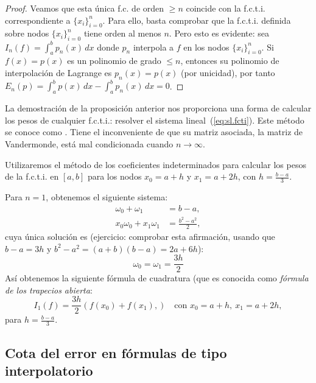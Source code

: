 \begin{proof}
   Veamos que esta única f.c. de orden $\ge n$ coincide con
  la f.c.t.i. correspondiente a $\{x_i\}_{i=0}^n$. Para ello, basta
  comprobar que la f.c.t.i. definida sobre nodos $\{x_i\}_{i=0}^n$
  tiene orden al menos $n$.
  Pero esto es evidente: sea $I_n(f)=\int_a^b p_n(x)\, dx$ donde $p_n$
  interpola a $f$ en los nodos $\{x_i\}_{i=0}^n$. Si $f(x)=p(x)$ es un
  polinomio de grado $\le n$, entonces su polinomio de interpolación
  de Lagrange es $p_n(x)=p(x)$ (por unicidad), por tanto
  $E_n(p)=\int_a^b p(x)\,dx - \int_a^b p_n(x)\,dx =0$.
\end{proof}

\begin{remark}
  \label{rk:6}
  La demostración de la proposición anterior nos proporciona una forma
  de calcular los pesos de cualquier f.c.t.i.: resolver el sistema
lineal~(\ref{eq:sl.fcti}). Este método se conoce como . Tiene el inconveniente de que su
matriz asociada, la matriz de Vandermonde, está mal condicionada
  cuando $n\to\infty$.
\end{remark}

\begin{example}
  \label{ex:coef-indetermin:formula-trapecios-abierta}
  Utilizaremos el método de los coeficientes indeterminados para
  calcular los pesos de la f.c.t.i. en $[a,b]$ para los nodos
  $x_0=a+h$ y $x_1=a+2h$, con $h=\frac{b-a}{3}$.

  Para $n=1$, obtenemos el siguiente sistema:
  \begin{align*}
    \omega_0 + \omega_1 &= b-a,
    \\
    x_0\omega_0 + x_1\omega_1 &= \frac{b^2-a^2}{2},
  \end{align*}
  cuya única solución es (ejercicio: comprobar esta afirmación, usando
  que $b-a=3h$ y $b^2-a^2 = (a+b)(b-a)=2a + 6h$):
  \begin{equation*}
    \omega_0=\omega_1=\frac{3h}{2}
  \end{equation*}
  Así obtenemos la siguiente fórmula de cuadratura (que es conocida
  como \textit{fórmula de los trapecios abierta}:
  \begin{equation*}
    I_1(f)=\frac{3h}{2}
    \left(
      f(x_0)+f(x_1),
    \right)
    \quad \text{con } x_0=a+h, \ x_1=a+2h,
  \end{equation*}
  para $h=\frac{b-a}{3}$.
\end{example}

\subsection*{Cota del error en fórmulas de tipo interpolatorio}


